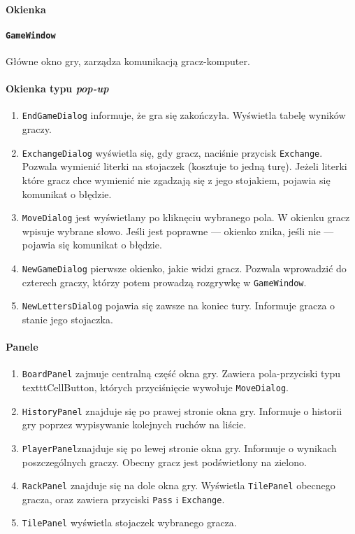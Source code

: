 \documentclass[a4paper]{article}
\begin{document}
\paragraph{Okienka}
\paragraph{\texttt{GameWindow}} Główne okno gry, zarządza komunikacją gracz-komputer.
\paragraph{Okienka typu \textit{pop-up}}
\begin{enumerate}
\item[] \texttt{EndGameDialog} informuje, że gra się zakończyła. Wyświetla tabelę wyników graczy.
\item[] \texttt{ExchangeDialog} wyświetla się, gdy gracz, naciśnie przycisk \texttt{Exchange}. Pozwala wymienić literki na stojaczek (kosztuje to jedną turę).
Jeżeli literki które gracz chce wymienić nie zgadzają się z jego stojakiem, pojawia się komunikat o błędzie.
\item[] \texttt{MoveDialog} jest wyświetlany po kliknęciu wybranego pola. W okienku gracz wpisuje wybrane słowo.
Jeśli jest poprawne --- okienko znika, jeśli nie --- pojawia się komunikat o błędzie.
\item[] \texttt{NewGameDialog} pierwsze okienko, jakie widzi gracz.
Pozwala wprowadzić do czterech graczy, którzy potem prowadzą rozgrywkę w \texttt{GameWindow}.
\item[] \texttt{NewLettersDialog} pojawia się zawsze na koniec tury. Informuje gracza o stanie jego stojaczka.
\end{enumerate}
\paragraph{Panele}
\begin{enumerate}
\item[] \texttt{BoardPanel} zajmuje centralną część okna gry. Zawiera pola-przyciski typu texttt{CellButton}, których przyciśnięcie wywołuje \texttt{MoveDialog}.
\item[] \texttt{HistoryPanel} znajduje się po prawej stronie okna gry. Informuje o historii gry poprzez wypisywanie kolejnych ruchów na liście.
\item[] \texttt{PlayerPanel}znajduje się po lewej stronie okna gry. Informuje o wynikach poszczególnych graczy. Obecny gracz jest podświetlony na zielono.
\item[] \texttt{RackPanel} znajduje się na dole okna gry. Wyświetla \texttt{TilePanel} obecnego gracza, oraz zawiera przyciski \texttt{Pass} i \texttt{Exchange}.
\item[] \texttt{TilePanel} wyświetla stojaczek wybranego gracza.
\end{enumerate}
\end{document}
